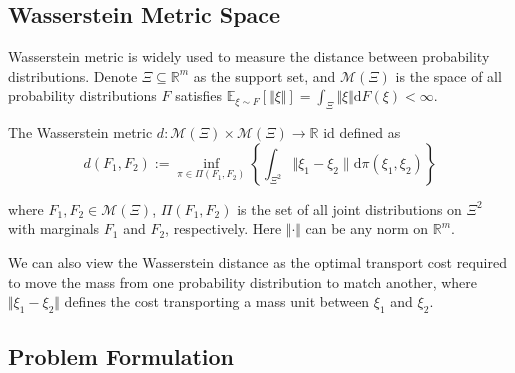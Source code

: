 \subsection{Wasserstein Metric Space}

Wasserstein metric is widely used to measure the distance between probability distributions. Denote $\Xi \subseteq \mathbb{R}^m$ as the support set, and $\mathcal{M}(\Xi)$ is the space of all probability distributions $F$ satisfies $\mathbb{E}_{\xi \sim F} [\Vert\xi\Vert] = \int_{\Xi} \Vert \xi \Vert \mathrm{d} F(\xi) < \infty$.  

\begin{definition} The Wasserstein metric $d : \mathcal{M}(\Xi) \times \mathcal{M}(\Xi) \rightarrow \mathbb{R}$ id defined as 
\begin{equation}
    d(F_1, F_2) := \inf_{\pi \in \Pi(F_1, F_2)} \left\{
    \int_{\Xi^2} \Vert \xi_1 - \xi_2 \| \mathrm{d} \pi(\xi_1, \xi_2) 
    \right\}
\end{equation}

where $F_1, F_2 \in \mathcal{M}(\Xi)$, $\Pi(F_1, F_2)$ is the set of all joint distributions on $\Xi^2$ with marginals $F_1$ and $F_2$, respectively. Here $\Vert \cdot \Vert$ can be any norm on $\mathbb{R}^m$.

\end{definition}

We can also view the Wasserstein distance as the optimal transport cost required to move the mass from one probability distribution to match another, where $\Vert \xi_1 - \xi_2 \Vert$ defines the cost transporting a mass unit between $\xi_1$ and $\xi_2$.




\subsection{Problem Formulation}
